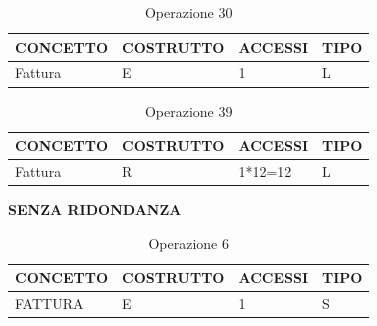 \begin{table}[H]
\centering
\caption{Operazione 30}
\begin{tabular}{llll}
\\ \hline
\multicolumn{1}{|l|}{\textbf{CONCETTO}} & \multicolumn{1}{l|}{\textbf{COSTRUTTO}} & \multicolumn{1}{l|}{\textbf{ACCESSI}} & \multicolumn{1}{l|}{\textbf{TIPO}} \\ \hline
\multicolumn{1}{|l|}{Fattura}
& \multicolumn{1}{l|}{E}                  & \multicolumn{1}{l|}{1}                & \multicolumn{1}{l|}{L}             \\ \hline
\end{tabular}
\end{table}

\begin{table}[H]
\centering
\caption{Operazione 39}
\begin{tabular}{llll}
\\ \hline
\multicolumn{1}{|l|}{\textbf{CONCETTO}} & \multicolumn{1}{l|}{\textbf{COSTRUTTO}} & \multicolumn{1}{l|}{\textbf{ACCESSI}} & \multicolumn{1}{l|}{\textbf{TIPO}} \\ \hline
\multicolumn{1}{|l|}{Fattura}
& \multicolumn{1}{l|}{R}                  & \multicolumn{1}{l|}{1*12=12}                & \multicolumn{1}{l|}{L}             \\ \hline
\end{tabular}
\end{table}

\centerline{\textbf{SENZA RIDONDANZA}}
\begin{table}[H]
\centering
\caption{Operazione 6}
\begin{tabular}{llll}
\\ \hline
\multicolumn{1}{|l|}{\textbf{CONCETTO}} & \multicolumn{1}{l|}{\textbf{COSTRUTTO}} & \multicolumn{1}{l|}{\textbf{ACCESSI}} & \multicolumn{1}{l|}{\textbf{TIPO}} \\ \hline
\multicolumn{1}{|l|}{FATTURA}
& \multicolumn{1}{l|}{E}                  & \multicolumn{1}{l|}{1}                & \multicolumn{1}{l|}{S}             \\ \hline
\end{tabular}
\end{table}


